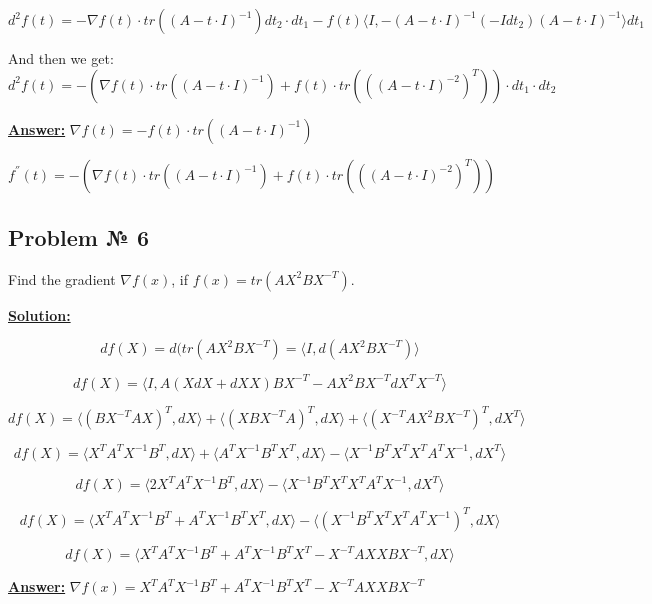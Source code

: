 \begin{equation*}
    d^2f(t) = -\nabla f(t) \cdot tr \left( (A-t \cdot I)^{-1} \right)dt_2\cdot dt_1 -
    f(t) \langle I, -(A-t \cdot I)^{-1}(-Idt_2)(A-t \cdot I)^{-1} \rangle dt_1
\end{equation*}

And then we get:
\begin{equation*}
    d^2f(t) = -\left( \nabla f(t) \cdot tr\left((A-t \cdot I)^{-1}\right) + f(t)\cdot tr\left( ((A-t\cdot I)^{-2})^T\right) \right) \cdot dt_1 \cdot dt_2
\end{equation*}

\underline{\textbf{Answer:}}
$\nabla f(t) = -f(t) \cdot tr \left( (A-t \cdot I)^{-1} \right)$

$f^{''}(t) = -\left( \nabla f(t) \cdot tr\left((A-t \cdot I)^{-1}\right) + f(t)\cdot tr\left( ((A-t\cdot I)^{-2})^T\right) \right)$
 
\subsection{Problem № 6}
Find the gradient $\nabla f(x)$, if $f(x) = tr(AX^2BX^{-T})$.

\underline{\textbf{Solution:}}

\begin{equation*}
    df(X) = d(tr(AX^2BX^{-T}) = \langle I, d(AX^2BX^{-T}) \rangle
\end{equation*}

\begin{equation*}
  df(X) = \langle I, A(XdX + dXX)BX^{-T} - AX^2BX^{-T}dX^TX^{-T} \rangle 
\end{equation*}

\begin{equation*}
    df(X) = \langle (BX^{-T}AX)^T, dX \rangle + \langle (XBX^{-T}A)^T, dX \rangle  + \langle (X^{-T}AX^2BX^{-T})^T, dX^T \rangle
\end{equation*}


\begin{equation*}
    df(X) = \langle X^TA^TX^{-1}B^T, dX \rangle + \langle A^TX^{-1}B^TX^T, dX \rangle - \langle
    X^{-1}B^TX^TX^TA^TX^{-1}, dX^T \rangle
\end{equation*}

\begin{equation*}
    df(X) = \langle 2X^TA^TX^{-1}B^T, dX \rangle - \langle
     X^{-1}B^TX^TX^TA^TX^{-1}, dX^T \rangle
\end{equation*}

\begin{equation*}
    df(X) = \langle X^TA^TX^{-1}B^T + A^TX^{-1}B^TX^T, dX \rangle - \langle
     (X^{-1}B^TX^TX^TA^TX^{-1})^T, dX \rangle
\end{equation*}

\begin{equation*}
    df(X) = \langle X^TA^TX^{-1}B^T + A^TX^{-1}B^TX^T -
     X^{-T}AXXBX^{-T}, dX \rangle
\end{equation*}

\underline{\textbf{Answer:}} $\nabla f(x) = X^TA^TX^{-1}B^T + A^TX^{-1}B^TX^T - X^{-T}AXXBX^{-T}$


